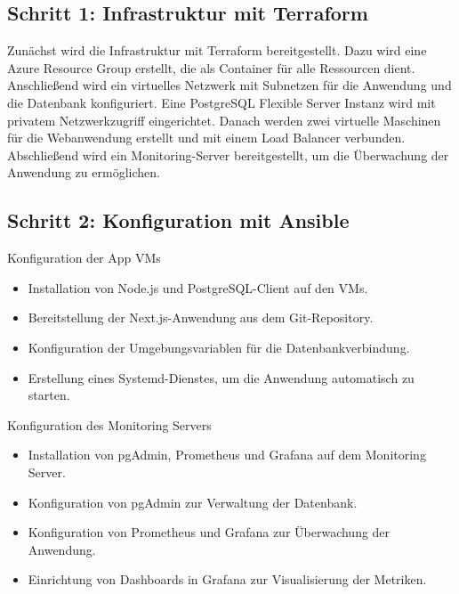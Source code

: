 \subsection*{Schritt 1: Infrastruktur mit Terraform}
Zunächst wird die Infrastruktur mit Terraform bereitgestellt. Dazu wird eine Azure Resource Group erstellt, die als Container für alle Ressourcen dient. Anschließend wird ein virtuelles Netzwerk mit Subnetzen für die Anwendung und die Datenbank konfiguriert. Eine PostgreSQL Flexible Server Instanz wird mit privatem Netzwerkzugriff eingerichtet. Danach werden zwei virtuelle Maschinen für die Webanwendung erstellt und mit einem Load Balancer verbunden. Abschließend wird ein Monitoring-Server bereitgestellt, um die Überwachung der Anwendung zu ermöglichen.

\subsection*{Schritt 2: Konfiguration mit Ansible}
Konfiguration der App VMs
\begin{itemize}
    \item Installation von Node.js und PostgreSQL-Client auf den VMs.
    \item Bereitstellung der Next.js-Anwendung aus dem Git-Repository.
    \item Konfiguration der Umgebungsvariablen für die Datenbankverbindung.
    \item Erstellung eines Systemd-Dienstes, um die Anwendung automatisch zu starten.
\end{itemize}

Konfiguration des Monitoring Servers
\begin{itemize}
    \item Installation von pgAdmin, Prometheus und Grafana auf dem Monitoring Server.
    \item Konfiguration von pgAdmin zur Verwaltung der Datenbank.
    \item Konfiguration von Prometheus und Grafana zur Überwachung der Anwendung.
    \item Einrichtung von Dashboards in Grafana zur Visualisierung der Metriken.
\end{itemize}
